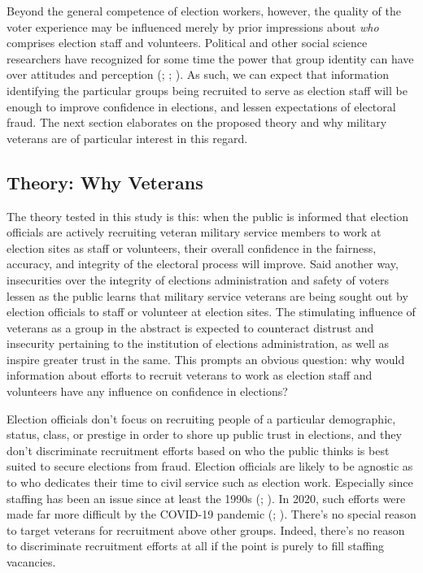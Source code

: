 \documentclass[
  12pt,
  letterpaper,
]{article}
\begin{document}
Beyond the general competence of election workers, however, the quality
of the voter experience may be influenced merely by prior impressions
about \emph{who} comprises election staff and volunteers. Political and
other social science researchers have recognized for some time the power
that group identity can have over attitudes and perception
(;
;
). As such, we can
expect that information identifying the particular groups being
recruited to serve as election staff will be enough to improve
confidence in elections, and lessen expectations of electoral fraud. The
next section elaborates on the proposed theory and why military veterans
are of particular interest in this regard.

\subsection{Theory: Why Veterans}\label{theory-why-veterans}

The theory tested in this study is this: when the public is informed
that election officials are actively recruiting veteran military service
members to work at election sites as staff or volunteers, their overall
confidence in the fairness, accuracy, and integrity of the electoral
process will improve. Said another way, insecurities over the integrity
of elections administration and safety of voters lessen as the public
learns that military service veterans are being sought out by election
officials to staff or volunteer at election sites. The stimulating
influence of veterans as a group in the abstract is expected to
counteract distrust and insecurity pertaining to the institution of
elections administration, as well as inspire greater trust in the same.
This prompts an obvious question: why would information about efforts to
recruit veterans to work as election staff and volunteers have any
influence on confidence in elections?

Election officials don't focus on recruiting people of a particular
demographic, status, class, or prestige in order to shore up public
trust in elections, and they don't discriminate recruitment efforts
based on who the public thinks is best suited to secure elections from
fraud. Election officials are likely to be agnostic as to who dedicates
their time to civil service such as election work. Especially since
staffing has been an issue since at least the 1990s
(;
). In 2020, such efforts
were made far more difficult by the COVID-19 pandemic
(; ). There's no special reason to target veterans for recruitment
above other groups. Indeed, there's no reason to discriminate
recruitment efforts at all if the point is purely to fill staffing
vacancies.
\end{document}
